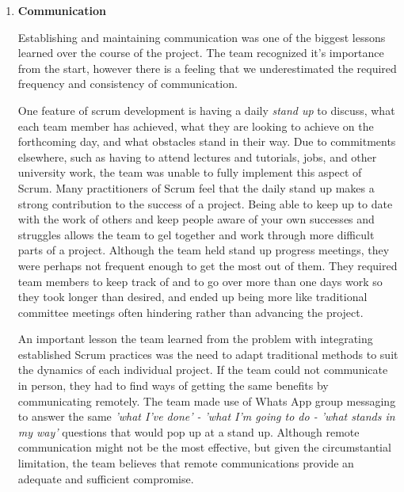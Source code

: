 \documentclass[11pt]{article}
\begin{document}
\begin{enumerate}
	
	\item \textbf{Communication}
	
	Establishing and maintaining communication was one of the biggest lessons learned over the course of the project. The team recognized it's importance from the start, however there is a feeling that we underestimated the required frequency and consistency of communication.
	
	One feature of scrum development is having a daily \textit{stand up} to discuss, what each team member has achieved, what they are looking to achieve on the forthcoming day, and what obstacles stand in their way. Due to commitments elsewhere, such as having to attend lectures and tutorials, jobs, and other university work, the team was unable to fully implement this aspect of Scrum. Many practitioners of Scrum feel that the daily stand up makes a strong contribution to the success of a project. Being able to keep up to date with the work of others and keep people aware of your own successes and struggles allows the team to gel together and work through more difficult parts of a project. Although the team held stand up progress meetings, they were perhaps not frequent enough to get the most out of them. They required team members to keep track of and to go over more than one days work so they took longer than desired, and ended up being more like traditional committee meetings often hindering rather than advancing the project.
	
	An important lesson the team learned from the problem with integrating established Scrum practices was the need to adapt traditional methods to suit the dynamics of each individual project. If the team could not communicate in person, they had to find ways of getting the same benefits by communicating remotely. The team made use of Whats App group messaging to answer the same \textit{'what I've done' - 'what I'm going to do - 'what stands in my way'} questions that would pop up at a stand up. Although remote communication might not be the most effective, but given the circumstantial limitation, the team believes that remote communications provide an adequate and sufficient compromise. 
	


\end{enumerate}
\end{document}
